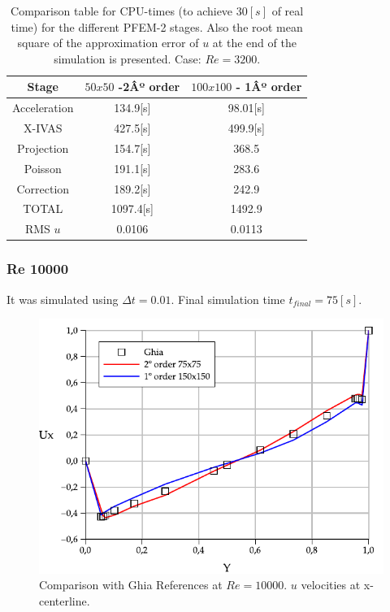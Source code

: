 \begin{table}[htbp]
\begin{center}
{\footnotesize
\begin{tabular}[h]{||c|c|c||}
    \hline
      Stage & $50x50$  -2Âº order & $100x100$ - 1Âº order\\
      \hline
      \hline
	Acceleration & 134.9[s]& 98.01[s]\\
	X-IVAS & 427.5[s]& 499.9[s] \\
	Projection & 154.7[s]& 368.5\\
	Poisson & 191.1[s]& 283.6\\
	Correction & 189.2[s]& 242.9\\
      \hline
	TOTAL & 1097.4[s]& 1492.9\\
      \hline
      \hline
	RMS $u$ & 0.0106 & 0.0113 \\
      \hline
      \hline
\end{tabular}
}
\caption{\label{Tabla:times_Re_3200} Comparison table for CPU-times (to achieve $30[s]$ of real time) for the different PFEM-2 stages. Also the root mean square of the approximation error of $u$ at the end of the simulation is presented. Case: $Re=3200$.}
\end{center}
\end{table}

\newpage

\subsubsection{Re 10000}


It was simulated using $\Delta t = 0.01$. Final simulation time $t_{final} = 75[s]$.

\begin{figure}[htbp]
  \begin{center}
      \includegraphics[width=.85\linewidth]{../images/Re_10000_Ux.pdf}
  \end{center}
  \caption{\label{fg:Re10000} Comparison with Ghia References at $Re=10000$. $u$ velocities at x-centerline.}
\end{figure}


